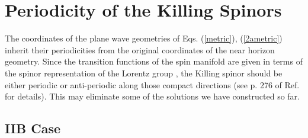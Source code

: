 \documentclass[a4paper,12pt]{article}
\begin{document}
\section{Periodicity of the Killing Spinors}\label{vi}

The coordinates of the plane wave geometries of Eqs. (\ref{metric}), (\ref{2ametric}) inherit their periodicities from the original coordinates of the near horizon geometry. Since the transition functions of the spin manifold are given in terms of the spinor representation of the Lorentz group \coordHE{}, the Killing spinor should be either periodic or anti-periodic along those compact directions (see p. 276 of Ref. \cite{gsw} for details). This may eliminate some of the solutions we have constructed so far.

\subsection{IIB Case}
\end{document}
